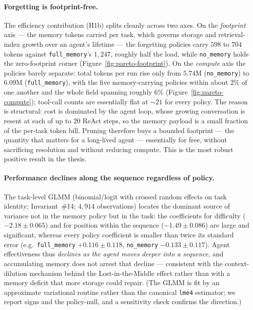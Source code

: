 \paragraph{Forgetting is footprint-free.}
The efficiency contribution (H1b) splits cleanly across two axes. On the
\emph{footprint} axis --- the memory tokens carried per task, which governs storage and
retrieval-index growth over an agent's lifetime --- the forgetting policies carry $598$ to
$704$ tokens against \texttt{full\_memory}'s $1{,}247$, roughly half the load, while
\texttt{no\_memory} holds the zero-footprint corner (Figure~\ref{fig:pareto-footprint}).
On the \emph{compute} axis the policies barely separate: total tokens per run rise only
from $5.74$M (\texttt{no\_memory}) to $6.09$M (\texttt{full\_memory}), with the five
memory-carrying policies within about $2\%$ of one another and the whole field spanning
roughly $6\%$ (Figure~\ref{fig:pareto-compute}); tool-call counts are essentially flat at
$\sim\!21$ for every policy. The reason is structural: cost is dominated by the agent loop,
whose growing conversation is resent at each of up to $20$ ReAct steps, so the memory
payload is a small fraction of the per-task token bill. Pruning therefore buys a bounded
footprint --- the quantity that matters for a long-lived agent --- essentially for free,
without sacrificing resolution and without reducing compute. This is the most robust
positive result in the thesis.

\paragraph{Performance declines along the sequence regardless of policy.}
The task-level GLMM (binomial/logit with crossed random effects on task identity;
Invariant~\#14; $4{,}914$ observations) locates the dominant source of variance not in the
memory policy but in the task: the coefficients for difficulty ($-2.18 \pm 0.065$) and for
position within the sequence ($-1.49 \pm 0.086$) are large and significant, whereas every
policy coefficient is smaller than twice its standard error (e.g.\ \texttt{full\_memory}
$+0.116 \pm 0.118$, \texttt{no\_memory} $-0.133 \pm 0.117$). Agent effectiveness thus
\emph{declines as the agent moves deeper into a sequence}, and accumulating memory does not
arrest that decline --- consistent with the context-dilution mechanism behind the
Lost-in-the-Middle effect \cite{liu2024} rather than with a memory deficit that more
storage could repair. (The GLMM is fit by an approximate variational routine rather than
the canonical \texttt{lme4} estimator; we report signs and the policy-null, and a
sensitivity check confirms the direction.)

